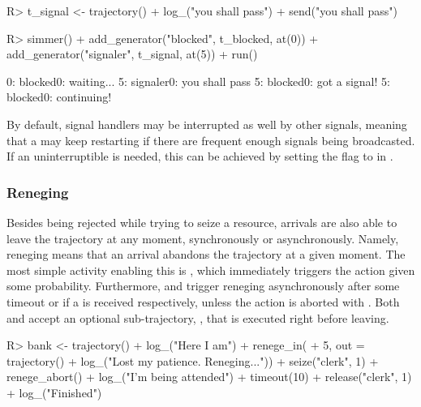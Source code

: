 \documentclass[
  nojss]{jss}
\begin{document}
\begin{CodeChunk}
\begin{CodeInput}
R> t_signal <- trajectory() %
+   log_("you shall pass") %
+   send("you shall pass")
\end{CodeInput}
\end{CodeChunk}

\begin{CodeChunk}
\begin{CodeInput}
R> simmer() %
+   add_generator("blocked", t_blocked, at(0)) %
+   add_generator("signaler", t_signal, at(5)) %
+   run() %
\end{CodeInput}
\begin{CodeOutput}
0: blocked0: waiting...
5: signaler0: you shall pass
5: blocked0: got a signal!
5: blocked0: continuing!
\end{CodeOutput}
\end{CodeChunk}

By default, signal handlers may be interrupted as well by other signals,
meaning that a  may keep restarting if there are frequent
enough signals being broadcasted. If an uninterruptible 
is needed, this can be achieved by setting the flag 
to  in .

\hypertarget{reneging}{%
\subsubsection{Reneging}\label{reneging}}

Besides being rejected while trying to seize a resource, arrivals are
also able to leave the trajectory at any moment, synchronously or
asynchronously. Namely, reneging means that an arrival abandons the
trajectory at a given moment. The most simple activity enabling this is
, which immediately triggers the action given some
probability. Furthermore,  and 
trigger reneging asynchronously after some timeout  or if a
 is received respectively, unless the action is aborted
with . Both  and
 accept an optional sub-trajectory, , that
is executed right before leaving.

\begin{CodeChunk}
\begin{CodeInput}
R> bank <- trajectory() %
+   log_("Here I am") %
+   renege_in(
+     5, out = trajectory() %
+       log_("Lost my patience. Reneging...")) %
+   seize("clerk", 1) %
+   renege_abort() %
+   log_("I'm being attended") %
+   timeout(10) %
+   release("clerk", 1) %
+   log_("Finished")
\end{CodeInput}
\end{CodeChunk}
\end{document}
